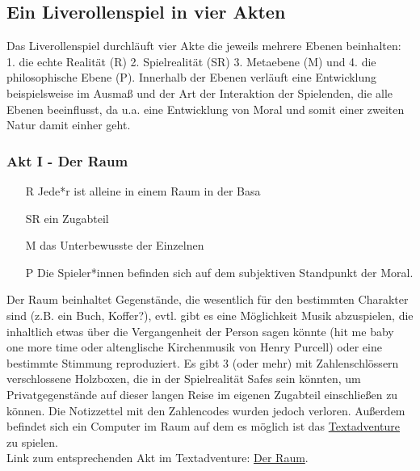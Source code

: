 \documentclass[a4paper, 12pt]{scrartcl}
\begin{document}
    \subsection{Ein Liverollenspiel in vier Akten}
    Das Liverollenspiel durchläuft vier Akte die jeweils mehrere Ebenen beinhalten: 1. die echte Realität (R) 2. Spielrealität (SR) 3. Metaebene (M) und 4. die philosophische Ebene (P). Innerhalb der Ebenen verläuft eine Entwicklung beispielsweise im Ausmaß und der Art der Interaktion der Spielenden, die alle Ebenen beeinflusst, da u.a. eine Entwicklung von Moral und somit einer zweiten Natur damit einher geht.
    \subsubsection{Akt I - Der Raum}
    \begin{itemize}
    \item[R] Jede*r ist alleine in einem Raum in der Basa
    \item[SR] ein Zugabteil 
    \item[M] das Unterbewusste der Einzelnen
    \item[P] Die Spieler*innen befinden sich auf dem subjektiven Standpunkt der Moral. 
    \end{itemize}
    Der Raum beinhaltet Gegenstände, die wesentlich für den bestimmten Charakter sind (z.B. ein Buch, Koffer?), evtl. gibt es eine Möglichkeit Musik abzuspielen, die inhaltlich etwas über die Vergangenheit der Person sagen könnte (\glqq hit me baby one more time\grqq{} oder altenglische Kirchenmusik von Henry Purcell) oder eine bestimmte Stimmung reproduziert.
     Es gibt 3 (oder mehr) mit Zahlenschlössern verschlossene Holzboxen, die in der Spielrealität Safes sein könnten, um Privatgegenstände auf dieser langen Reise im eigenen Zugabteil einschließen zu können.
    Die Notizzettel mit den Zahlencodes wurden jedoch verloren.
    Außerdem befindet sich ein Computer im Raum auf dem es möglich ist das \hyperref[textadventure]{Textadventure} zu spielen.\\
    Link zum entsprechenden Akt im Textadventure: \hyperref[der-raum]{Der Raum}.
    
\end{document}
